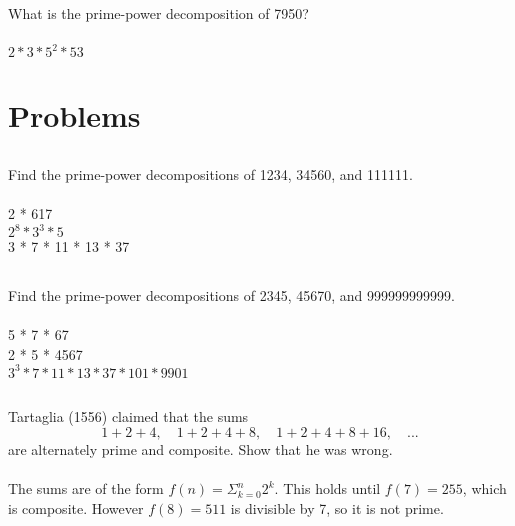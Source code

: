 \documentclass{article}
\begin{document}
\subsection{}
What is the prime-power decomposition of 7950?\\~\\
$2*3*5^2*53$

\section{Problems}

\subsection{}
Find the prime-power decompositions of 1234, 34560, and 111111.\\~\\
2 * 617\\
$2^8*3^3*5$\\
3 * 7 * 11 * 13 * 37

\subsection{}
Find the prime-power decompositions of 2345, 45670, and 999999999999.\\~\\
5 * 7 * 67\\
2 * 5 * 4567\\
$3^3 * 7 * 11 * 13 * 37 * 101 * 9901$

\subsection{}
Tartaglia (1556) claimed that the sums
\begin{equation}
    1 + 2 + 4, \quad 1 + 2 + 4 + 8, \quad 1 + 2 + 4 + 8 + 16, \quad ...
\end{equation}
are alternately prime and composite. Show that he was wrong.\\~\\
The sums are of the form $f(n) = \Sigma_{k=0}^n 2^k$.
This holds until $f(7) = 255$, which is composite.
However $f(8) = 511$ is divisible by 7, so it is not prime.\\

\end{document}
